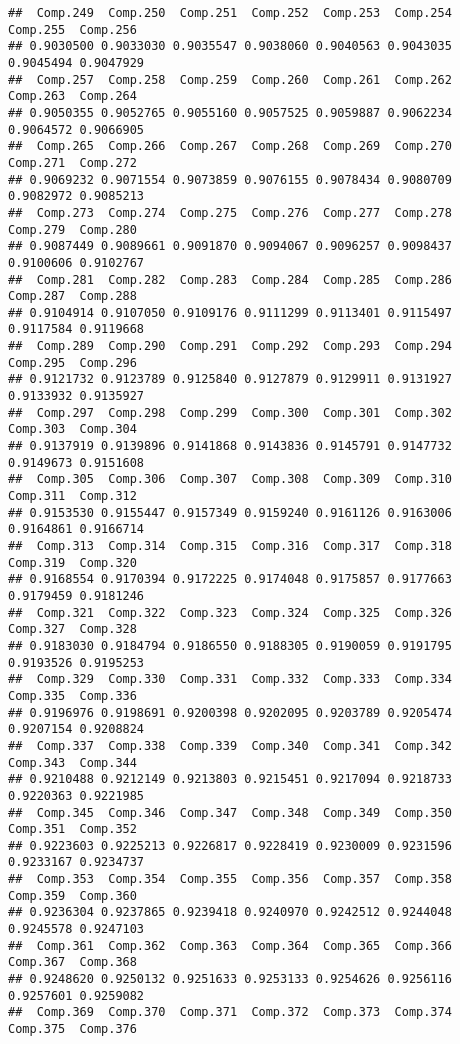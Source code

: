 \documentclass[
]{article}
\begin{document}
\begin{verbatim}
##  Comp.249  Comp.250  Comp.251  Comp.252  Comp.253  Comp.254  Comp.255  Comp.256 
## 0.9030500 0.9033030 0.9035547 0.9038060 0.9040563 0.9043035 0.9045494 0.9047929 
##  Comp.257  Comp.258  Comp.259  Comp.260  Comp.261  Comp.262  Comp.263  Comp.264 
## 0.9050355 0.9052765 0.9055160 0.9057525 0.9059887 0.9062234 0.9064572 0.9066905 
##  Comp.265  Comp.266  Comp.267  Comp.268  Comp.269  Comp.270  Comp.271  Comp.272 
## 0.9069232 0.9071554 0.9073859 0.9076155 0.9078434 0.9080709 0.9082972 0.9085213 
##  Comp.273  Comp.274  Comp.275  Comp.276  Comp.277  Comp.278  Comp.279  Comp.280 
## 0.9087449 0.9089661 0.9091870 0.9094067 0.9096257 0.9098437 0.9100606 0.9102767 
##  Comp.281  Comp.282  Comp.283  Comp.284  Comp.285  Comp.286  Comp.287  Comp.288 
## 0.9104914 0.9107050 0.9109176 0.9111299 0.9113401 0.9115497 0.9117584 0.9119668 
##  Comp.289  Comp.290  Comp.291  Comp.292  Comp.293  Comp.294  Comp.295  Comp.296 
## 0.9121732 0.9123789 0.9125840 0.9127879 0.9129911 0.9131927 0.9133932 0.9135927 
##  Comp.297  Comp.298  Comp.299  Comp.300  Comp.301  Comp.302  Comp.303  Comp.304 
## 0.9137919 0.9139896 0.9141868 0.9143836 0.9145791 0.9147732 0.9149673 0.9151608 
##  Comp.305  Comp.306  Comp.307  Comp.308  Comp.309  Comp.310  Comp.311  Comp.312 
## 0.9153530 0.9155447 0.9157349 0.9159240 0.9161126 0.9163006 0.9164861 0.9166714 
##  Comp.313  Comp.314  Comp.315  Comp.316  Comp.317  Comp.318  Comp.319  Comp.320 
## 0.9168554 0.9170394 0.9172225 0.9174048 0.9175857 0.9177663 0.9179459 0.9181246 
##  Comp.321  Comp.322  Comp.323  Comp.324  Comp.325  Comp.326  Comp.327  Comp.328 
## 0.9183030 0.9184794 0.9186550 0.9188305 0.9190059 0.9191795 0.9193526 0.9195253 
##  Comp.329  Comp.330  Comp.331  Comp.332  Comp.333  Comp.334  Comp.335  Comp.336 
## 0.9196976 0.9198691 0.9200398 0.9202095 0.9203789 0.9205474 0.9207154 0.9208824 
##  Comp.337  Comp.338  Comp.339  Comp.340  Comp.341  Comp.342  Comp.343  Comp.344 
## 0.9210488 0.9212149 0.9213803 0.9215451 0.9217094 0.9218733 0.9220363 0.9221985 
##  Comp.345  Comp.346  Comp.347  Comp.348  Comp.349  Comp.350  Comp.351  Comp.352 
## 0.9223603 0.9225213 0.9226817 0.9228419 0.9230009 0.9231596 0.9233167 0.9234737 
##  Comp.353  Comp.354  Comp.355  Comp.356  Comp.357  Comp.358  Comp.359  Comp.360 
## 0.9236304 0.9237865 0.9239418 0.9240970 0.9242512 0.9244048 0.9245578 0.9247103 
##  Comp.361  Comp.362  Comp.363  Comp.364  Comp.365  Comp.366  Comp.367  Comp.368 
## 0.9248620 0.9250132 0.9251633 0.9253133 0.9254626 0.9256116 0.9257601 0.9259082 
##  Comp.369  Comp.370  Comp.371  Comp.372  Comp.373  Comp.374  Comp.375  Comp.376 

\end{verbatim}
\end{document}
